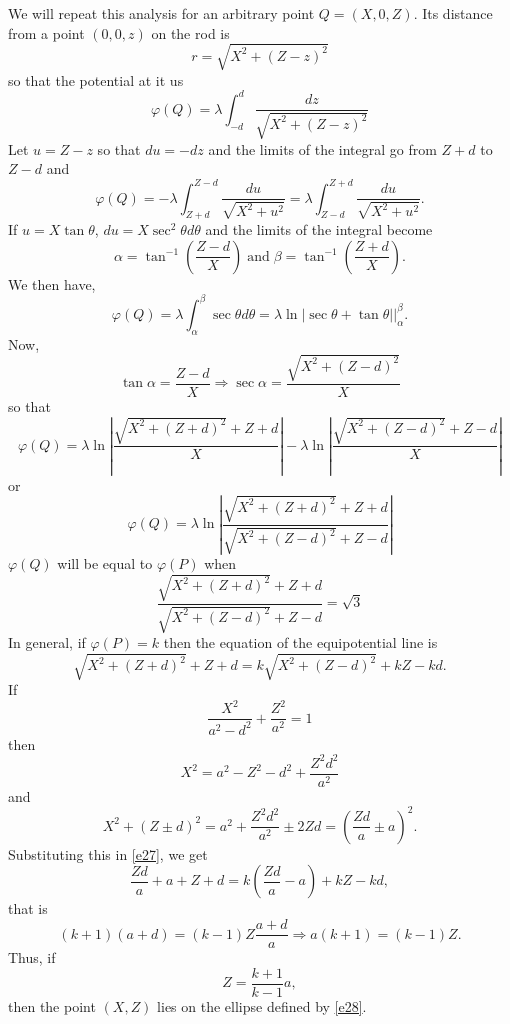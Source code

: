 \documentclass{article}
\begin{document}
\begin{enumerate}
We will repeat this analysis for an arbitrary point $Q = (X, 0, Z)$. Its distance 
from a point $(0, 0, z)$ on the rod is
\begin{equation}\label{e25}
r = \sqrt{X^2 + (Z - z)^2}
\end{equation}
so that the potential at it us
\[
\varphi(Q) = \lambda\int_{-d}^d\frac{dz}{\sqrt{X^2 + (Z - z)^2}}
\]
Let $u = Z - z$ so that $du = -dz$ and the limits of the integral go from
$Z + d$ to $Z - d$ and
\[
\varphi(Q) = -\lambda\int_{Z+d}^{Z-d}\frac{du}{\sqrt{X^2 + u^2}} = 
\lambda\int_{Z-d}^{Z+d}\frac{du}{\sqrt{X^2 + u^2}}.
\]
If $u = X\tan\theta$, $du = X\sec^2\theta d\theta$ and the limits of the
integral become 
\[
\alpha = \tan^{-1}\left(\frac{Z - d}{X}\right) \;\text{and}\;
\beta = \tan^{-1}\left(\frac{Z + d}{X}\right).
\]
We then have,
\[
\varphi(Q) = \lambda\int_\alpha^\beta \sec\theta d\theta = 
\lambda\ln|\sec\theta + \tan\theta|\Big|_\alpha^\beta.
\]
Now,
\[
\tan\alpha = \frac{Z-d}{X} \Rightarrow \sec\alpha=\frac{\sqrt{X^2 + (Z-d)^2}}{X}
\]
so that
\[
\varphi(Q) = \lambda\ln\left|\frac{\sqrt{X^2 + (Z+d)^2} + Z+d}{X}\right| - 
\lambda\ln\left|\frac{\sqrt{X^2 + (Z-d)^2} + Z-d}{X}\right|
\]
or
\begin{equation}\label{e26}
\varphi(Q) = \lambda\ln\left|\frac{\sqrt{X^2 + (Z+d)^2} + Z+d}{\sqrt{X^2 + (Z-d)^2} + Z-d}\right|
\end{equation}
$\varphi(Q)$ will be equal to $\varphi(P)$ when
\[
\frac{\sqrt{X^2 + (Z+d)^2} + Z+d}{\sqrt{X^2 + (Z-d)^2} + Z-d} = \sqrt{3}
\]
In general, if $\varphi(P) = k$ then the equation of the equipotential line is
\begin{equation}\label{e27}
\sqrt{X^2 + (Z+d)^2} + Z+d = k\sqrt{X^2 + (Z-d)^2} + kZ - kd.
\end{equation}
If
\begin{equation}\label{e28}
\frac{X^2}{a^2 - d^2} + \frac{Z^2}{a^2} = 1
\end{equation}
then
\begin{equation}\label{e29}
X^2 = a^2 - Z^2 - d^2 + \frac{Z^2d^2}{a^2}
\end{equation}
and
\[
X^2 + (Z \pm d)^2 = a^2 + \frac{Z^2d^2}{a^2} \pm 2Zd = \left(\frac{Zd}{a} \pm a\right)^2.
\]
Substituting this in \eqref{e27}, we get
\begin{equation}\label{e30}
\frac{Zd}{a} + a + Z + d = k\left(\frac{Zd}{a} - a\right) + kZ - kd,
\end{equation}
that is
\[
(k + 1)(a + d) = (k - 1)Z\frac{a + d}{a} \Rightarrow a(k + 1) = (k - 1)Z.
\]
Thus, if
\begin{equation}\label{e31}
Z = \frac{k + 1}{k - 1}a,
\end{equation}
then the point $(X, Z)$ lies on the ellipse defined by \eqref{e28}.


\end{enumerate}
\end{document}
